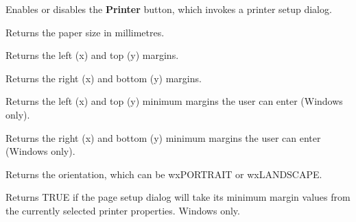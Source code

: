Enables or disables the {\bf Printer} button, which invokes a printer setup dialog.

\label{wxpagesetupdatagetpapersize}


Returns the paper size in millimetres.

\label{wxpagesetupdatagetmargintopleft}


Returns the left (x) and top (y) margins.

\label{wxpagesetupdatagetmarginbottomright}


Returns the right (x) and bottom (y) margins.

\label{wxpagesetupdatagetminmargintopleft}


Returns the left (x) and top (y) minimum margins the user can enter (Windows only).

\label{wxpagesetupdatagetminmarginbottomright}


Returns the right (x) and bottom (y) minimum margins the user can enter (Windows only).

\label{wxpagesetupdatagetorientation}


Returns the orientation, which can be wxPORTRAIT or wxLANDSCAPE.

\label{wxpagesetupdatagetdefaultminmargins}


Returns TRUE if the page setup dialog will take its minimum margin values from the currently
selected printer properties. Windows only.

\label{wxpagesetupdatagetenablemargins}



